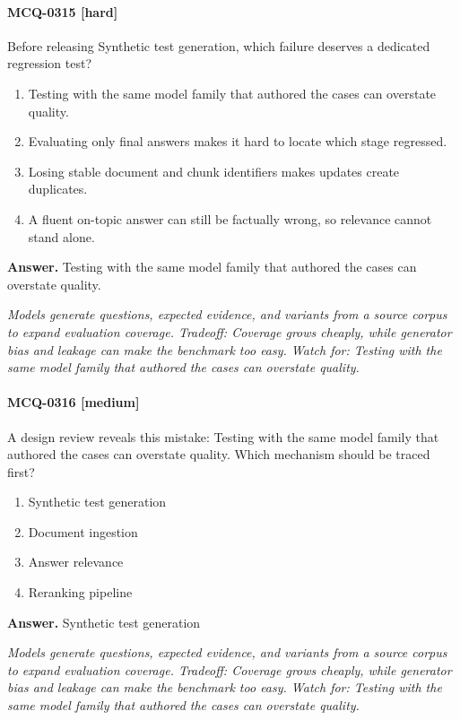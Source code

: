 \paragraph{MCQ-0315 [hard]} Before releasing Synthetic test generation, which failure deserves a dedicated regression test?
\begin{enumerate}[label=\Alph*.]
\item Testing with the same model family that authored the cases can overstate quality.
\item Evaluating only final answers makes it hard to locate which stage regressed.
\item Losing stable document and chunk identifiers makes updates create duplicates.
\item A fluent on-topic answer can still be factually wrong, so relevance cannot stand alone.
\end{enumerate}
\noindent\textbf{Answer.} Testing with the same model family that authored the cases can overstate quality.
\par\textit{Models generate questions, expected evidence, and variants from a source corpus to expand evaluation coverage. Tradeoff: Coverage grows cheaply, while generator bias and leakage can make the benchmark too easy. Watch for: Testing with the same model family that authored the cases can overstate quality.}
\paragraph{MCQ-0316 [medium]} A design review reveals this mistake: Testing with the same model family that authored the cases can overstate quality. Which mechanism should be traced first?
\begin{enumerate}[label=\Alph*.]
\item Synthetic test generation
\item Document ingestion
\item Answer relevance
\item Reranking pipeline
\end{enumerate}
\noindent\textbf{Answer.} Synthetic test generation
\par\textit{Models generate questions, expected evidence, and variants from a source corpus to expand evaluation coverage. Tradeoff: Coverage grows cheaply, while generator bias and leakage can make the benchmark too easy. Watch for: Testing with the same model family that authored the cases can overstate quality.}

